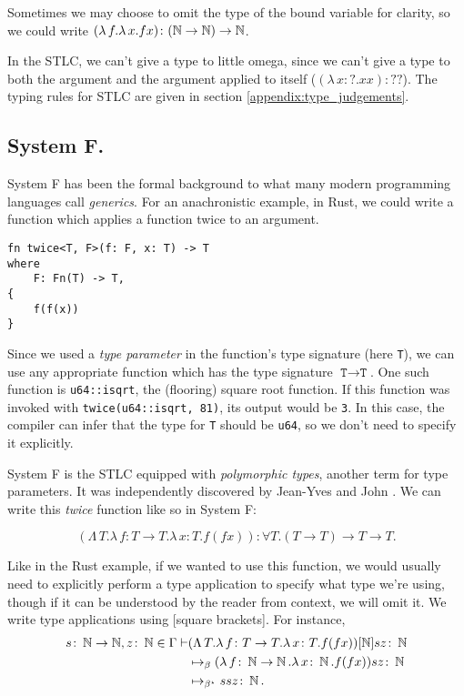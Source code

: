 Sometimes we may choose to omit the type of the bound variable for clarity, so we could write
$(\lambda \, f. \lambda \, x. fx) \colon (\operatorname{\mathbb{N}} \to \operatorname{\mathbb{N}}) \to \operatorname{\mathbb{N}}$.

In the STLC, we can't give a type to little omega, since we can't give a type to both the argument
and the argument applied to itself ($(\lambda \, x  \colon ? . x x) \colon ??$). The typing rules for
STLC are given in section \ref{appendix:type_judgements}.

\subsection{System F.}
System F has been the formal background to what many modern programming
languages call \textit{generics}. For an anachronistic example, in Rust, we could write a function
which applies a function twice to an argument.

\begin{verbatim}
fn twice<T, F>(f: F, x: T) -> T
where
    F: Fn(T) -> T,
{
    f(f(x))
}
\end{verbatim}

Since we used a \textit{type parameter} in the function's type signature (here \texttt{T}), we can
use any appropriate function which has the type signature $\texttt{T} \to \texttt{T}$. One such
function is \texttt{u64::isqrt}, the (flooring) square root function. If this function was invoked
with \texttt{twice(u64::isqrt, 81)}, its output would be \texttt{3}. In this case, the compiler can
infer that the type for \texttt{T} should be \texttt{u64}, so we don't need to specify it
explicitly.

System F is the STLC equipped with \textit{polymorphic types}, another term for type parameters. It
was independently discovered by Jean-Yves \citet{girard_interpretation_1972} and John
\citet{goos_towards_1974}. We can write this \textit{twice} function like so in System F:

\begin{equation*}
  (\Lambda \, T. \lambda \, f \colon T \to T . \lambda \, x \colon T . f (f x))
  \colon \forall T . (T \to T) \to T \to T.
\end{equation*}

Like in the Rust example, if we wanted to use this function, we would usually need to explicitly
perform a type application to specify what type we're using, though if it can be understood by the
reader from context, we will omit it. We write type applications using [square brackets]. For
instance,
\begin{align*}
  s \colon \operatorname{\mathbb{N}} \to \operatorname{\mathbb{N}}, z \colon \operatorname{\mathbb{N}} \in \Gamma \vdash
  &(\Lambda \, T. \lambda \, f \colon T \to T . \lambda \, x \colon T . f (f x))[\operatorname{\mathbb{N}}] s z \colon \operatorname{\mathbb{N}}\\
  &\mapsto_{\beta} (\lambda \, f \colon \operatorname{\mathbb{N}} \to \operatorname{\mathbb{N}} . \lambda \, x \colon \operatorname{\mathbb{N}} . f (f x)) s z \colon \operatorname{\mathbb{N}}\\
  &\mapsto_{\beta^{\star}} s s z \colon \operatorname{\mathbb{N}}.
\end{align*}
